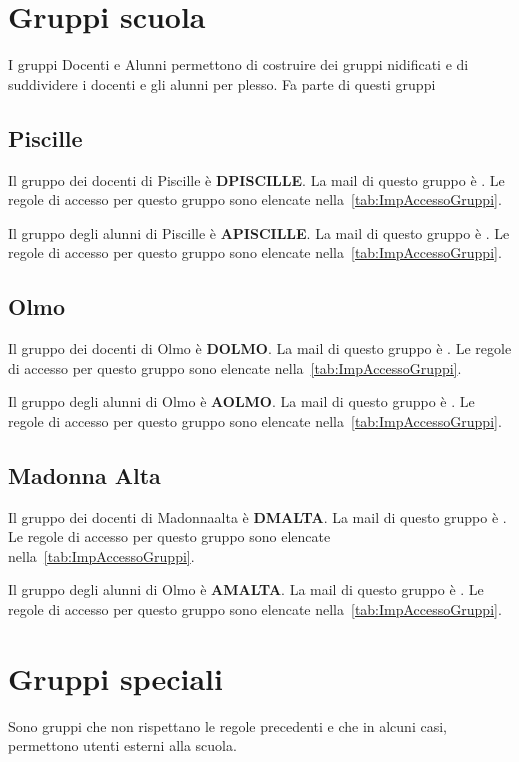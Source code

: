\section{Gruppi scuola}
I gruppi Docenti e Alunni permettono di costruire dei gruppi nidificati e di suddividere i docenti e gli alunni per plesso.  Fa parte di questi gruppi 
\subsection{Piscille}
Il gruppo dei docenti di Piscille è \textbf{DPISCILLE}. La mail di questo gruppo è . Le  regole di accesso per questo gruppo sono elencate nella~\cref{tab:ImpAccessoGruppi}. 

Il gruppo degli alunni di Piscille è \textbf{APISCILLE}. La mail di questo gruppo è . Le  regole di accesso per questo gruppo sono elencate nella~\cref{tab:ImpAccessoGruppi}. 
\subsection{Olmo}
Il gruppo dei docenti di Olmo è \textbf{DOLMO}. La mail di questo gruppo è . Le  regole di accesso per questo gruppo sono elencate nella~\cref{tab:ImpAccessoGruppi}. 

Il gruppo degli alunni di Olmo è \textbf{AOLMO}. La mail di questo gruppo è . Le  regole di accesso per questo gruppo sono elencate nella~\cref{tab:ImpAccessoGruppi}. 
\subsection{Madonna Alta}
Il gruppo dei docenti di Madonnaalta è \textbf{DMALTA}. La mail di questo gruppo è . Le  regole di accesso per questo gruppo sono elencate nella~\cref{tab:ImpAccessoGruppi}. 

Il gruppo degli alunni di Olmo è \textbf{AMALTA}. La mail di questo gruppo è . Le  regole di accesso per questo gruppo sono elencate nella~\cref{tab:ImpAccessoGruppi}. 
\section{Gruppi speciali}
Sono gruppi che non rispettano le regole precedenti e che in alcuni casi, permettono utenti esterni alla scuola.
